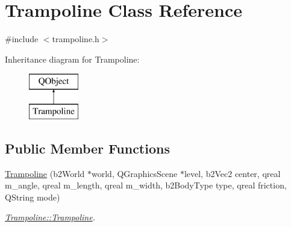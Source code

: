 \hypertarget{class_trampoline}{}\section{Trampoline Class Reference}
\label{class_trampoline}


{\ttfamily \#include $<$trampoline.\+h$>$}

Inheritance diagram for Trampoline\+:\begin{figure}[H]
\begin{center}
\leavevmode
\includegraphics[height=2.000000cm]{class_trampoline}
\end{center}
\end{figure}
\subsection*{Public Member Functions}
\begin{DoxyCompactItemize}
\item 
\hyperlink{class_trampoline_a7f77638c6896a68464545bf3373df32b}{Trampoline} (b2\+World $\ast$world, Q\+Graphics\+Scene $\ast$level, b2\+Vec2 center, qreal m\+\_\+angle, qreal m\+\_\+length, qreal m\+\_\+width, b2\+Body\+Type type, qreal friction, Q\+String mode)
\begin{DoxyCompactList}\small\item\em \hyperlink{class_trampoline_a7f77638c6896a68464545bf3373df32b}{Trampoline\+::\+Trampoline}. \end{DoxyCompactList}\end{DoxyCompactItemize}
